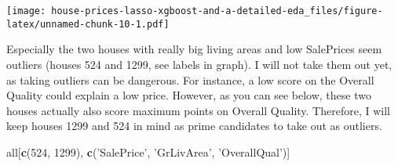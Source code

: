 \documentclass[]{article}
\newenvironment{Shaded}{\begin{snugshade}}{\end{snugshade}}
\newcommand{\KeywordTok}[1]{\textcolor[rgb]{0.13,0.29,0.53}{\textbf{#1}}}
\newcommand{\DataTypeTok}[1]{\textcolor[rgb]{0.13,0.29,0.53}{#1}}
\newcommand{\DecValTok}[1]{\textcolor[rgb]{0.00,0.00,0.81}{#1}}
\newcommand{\StringTok}[1]{\textcolor[rgb]{0.31,0.60,0.02}{#1}}
\newcommand{\OtherTok}[1]{\textcolor[rgb]{0.56,0.35,0.01}{#1}}
\newcommand{\OperatorTok}[1]{\textcolor[rgb]{0.81,0.36,0.00}{\textbf{#1}}}
\newcommand{\NormalTok}[1]{#1}
\begin{document}
\begin{Shaded}
\end{Shaded}

\texttt{[image: house-prices-lasso-xgboost-and-a-detailed-eda\_files/figure-latex/unnamed-chunk-10-1.pdf]}

Especially the two houses with really big living areas and low
SalePrices seem outliers (houses 524 and 1299, see labels in graph). I
will not take them out yet, as taking outliers can be dangerous. For
instance, a low score on the Overall Quality could explain a low price.
However, as you can see below, these two houses actually also score
maximum points on Overall Quality. Therefore, I will keep houses 1299
and 524 in mind as prime candidates to take out as outliers.

\begin{Shaded}
\begin{Highlighting}[]
\NormalTok{all[}\KeywordTok{c}\NormalTok{(}\DecValTok{524}\NormalTok{, }\DecValTok{1299}\NormalTok{), }\KeywordTok{c}\NormalTok{(}\StringTok{'SalePrice'}\NormalTok{, }\StringTok{'GrLivArea'}\NormalTok{, }\StringTok{'OverallQual'}\NormalTok{)]}
\end{Highlighting}
\end{Shaded}
\end{document}
